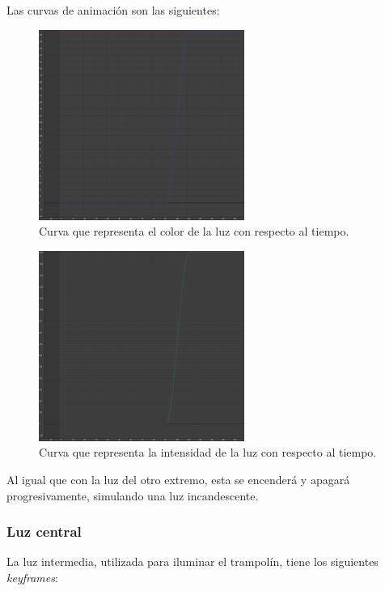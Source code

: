 \documentclass{article}
\begin{document}
Las curvas de animación son las siguientes:

\begin{figure}[H]
    \centering
    \includegraphics[width=0.6\textwidth]{imagenes/curvas/LR/filter.png}
    \caption{Curva que representa el color de la luz con respecto al tiempo.}
 \end{figure}

 \begin{figure}[H]
    \centering
    \includegraphics[width=0.6\textwidth]{imagenes/curvas/LR/intensity.png}
    \caption{Curva que representa la intensidad de la luz con respecto al tiempo.}
 \end{figure}

Al igual que con la luz del otro extremo, esta se encenderá y apagará progresivamente, simulando una luz incandescente.


\subsubsection{Luz central}

La luz intermedia, utilizada para iluminar el trampolín, tiene los siguientes \textit{keyframes}:
\end{document}
